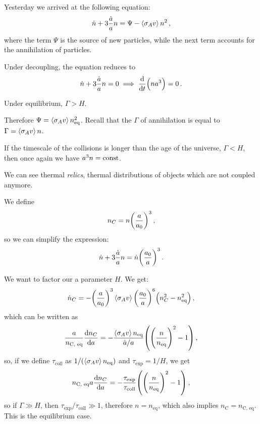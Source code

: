 \documentclass[main.tex]{subfiles}
\begin{document}

Yesterday we arrived at the following equation: 
%
\begin{align}
  \dot{n} + 3 \frac{\dot{a}}{a} n = \Psi - \expval{\sigma_A v} n^2
\,,
\end{align}
%
where the term \(\Psi \) is the source of new particles, while the next term accounts for the annihilation of particles. 

Under decoupling, the equation reduces to 
%
\begin{align}
  \dot{n} + 3 \frac{\dot{a}}{a} n = 0 \implies \dv{}{t} \qty(n a^3) = 0 
\,.
\end{align}
%

Under equilibrium, \(\Gamma > H\).

Therefore \(\Psi = \expval{\sigma _A v} n^2 _{\text{eq}}\). 
Recall that the \(\Gamma \) of annihilation is equal to \(\Gamma  = \expval{\sigma _A v} n\). 

If the timescale of the collisions is longer than the age of the universe, \(\Gamma < H\), then once again we have \(a^3n = \text{const}\). 

We can see thermal \emph{relics}, thermal distributions of objects which are not coupled anymore. 

We define 
%
\begin{align}
  n_C = n \qty(\frac{a}{a_0 })^3
\,,
\end{align}
%
so we can simplify the expression: 
%
\begin{align}
  \dot{n} + 3 \frac{\dot{a}}{a} n = \dot{n} \qty(\frac{a_0 }{a})^3
\,.
\end{align}

We want to factor our a parameter \(H\). We get: 
%
\begin{align}
  \dot{n}_C = - \qty(\frac{a }{a_0 })^3
  \expval{\sigma _A v } \qty(\frac{a_0 }{a})^6 \qty(n_C^2-n^2 _{\text{eq}})
\,,
\end{align}
%
which can be written as 
%
\begin{align}
  \frac{a}{n _{\text{C, eq}}} \dv{n_C}{a} = - \frac{\expval{\sigma _A v }n _{\text{eq}}}{\dot{a}/a} \qty(\qty(\frac{n}{n _{\text{eq}}})^2- 1)
\,,
\end{align}
%
so, if we define \(\tau _{\text{coll}}\) as \(1 / (\expval{\sigma _A v} n _{\text{eq}})\) and \(\tau _{\text{exp}} = 1/H\), we get 
%
\begin{align}
  n _{\text{C, eq}} a \dv{n_C}{a}
  = - \frac{\tau _{\text{exp}}}{\tau _{\text{coll}}} \qty(\qty(\frac{n}{n _{\text{eq}}})^2 -1 )
\,,
\end{align}
%
so if \(\Gamma \gg H\), then \(\tau _{\text{exp}} / \tau _{\text{coll}} \gg 1\), therefore \(n = n _{\text{eq}}\), which also implies \(n _{\text{C}} = n _{\text{C, eq}}\). This is the equilibrium case. 
\end{document}
